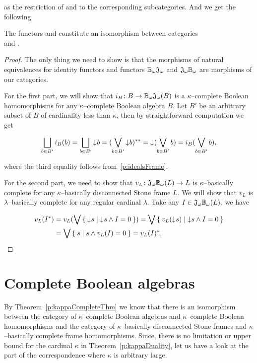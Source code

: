 \noindent as the restriction of \JO{} and \BcO{} to the corresponding subcategories. And we get the following

\begin{theorem*}\label{p:kappaDuality}
    The functors \JK{} and \BcK{} constitute an isomorphism between categories \\ \kComplBool{} and \kBDStoneFrm.
\end{theorem*}
\begin{proof}
    The only thing we need to show is that the morphisms of natural equivalences for identity functors and functors $\mathbb{B}_{\omega}\mathfrak{J}_{\omega}$ and $\mathfrak{J}_{\omega}\mathbb{B}_{\omega}$ are morphisms of our categories.

    For the first part, we will show that $i_B\colon B \to \mathbb{B}_{\omega}\mathfrak{J}_{\omega}(B)$ is a $\kappa$--complete Boolean homomorphisms for any $\kappa$--complete Boolean algebra $B$. Let $B'$ be an arbitrary subset of $B$ of cardinality less than $\kappa$, then by straightforward computation we get

    $$
        \bigsqcup_{b\in B'} i_B(b) = \bigsqcup_{b\in B'} \mathord{\downarrow}\mkern1mu b = (\bigvee_{b\in B'} \mathord{\downarrow}\mkern1mu b)^{**} = \mathord{\downarrow}\mkern1mu (\bigvee_{b\in B'} b) = i_B(\bigvee_{b\in B'} b),
    $$

    \noindent where the third equality follows from~\ref{p:idealsFrame}.

    For the second part, we need to show that $v_L\colon \mathfrak{J}_{\omega}\mathbb{B}_{\omega}(L) \to L$ is $\kappa$--basically complete for any $\kappa$--basically disconnected Stone frame $L$. We will show that $v_L$ is $\lambda$--basically complete for any regular cardinal $\lambda$. Take any $I \in \mathfrak{J}_{\omega}\mathbb{B}_{\omega}(L)$, we have

    \begin{align*}
        v_L(I^*) &= v_L(\bigvee \Set{ \mathord{\downarrow}\mkern1mus | \mathord{\downarrow}\mkern1mus \wedge I = 0 })
                  = \bigvee \Set{ v_L(\mathord{\downarrow}\mkern1mus) | \mathord{\downarrow}\mkern1mus \wedge I = 0 } \\
                 &= \bigvee \Set{ s | s \wedge v_L(I) = 0 } = v_L(I)^*.
    \end{align*}
\end{proof}


\section{Complete Boolean algebras}

By Theorem~\ref{p:kappaCompleteThm} we know that there is an isomorphism between the category of $\kappa$--complete Boolean algebras and $\kappa$--complete Boolean homomorphisms and the category of $\kappa$--basically disconnected Stone frames and $\kappa$--basically complete frame homomorphisms. Since, there is no limitation or upper bound for the cardinal $\kappa$ in Theorem~\ref{p:kappaDuality}, let us have a look at the part of the correspondence where $\kappa$ is arbitrary large.

